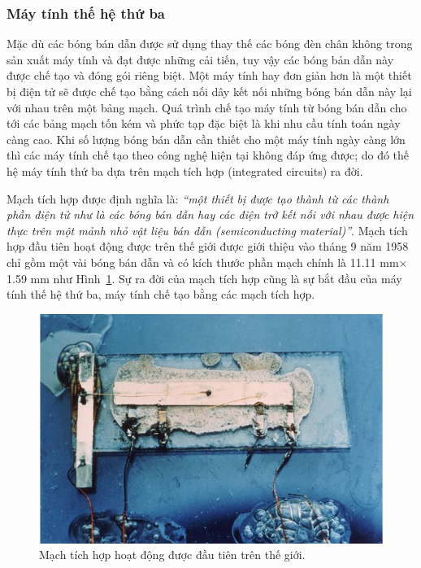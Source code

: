 \subsubsection{Máy tính thế hệ thứ ba}
Mặc dù các bóng bán dẫn được sử dụng thay thế các bóng đèn chân không trong sản xuất máy tính và đạt được những cải tiến, tuy vậy các bóng bản dẫn này được chế tạo và đóng gói riêng biệt. Một máy tính hay đơn giản hơn là một thiết bị điện tử sẽ được chế tạo bằng cách nối dây kết nối những bóng bán dẫn này lại với nhau trên một bảng mạch. Quá trình chế tạo máy tính từ bóng bán dẫn cho tới các bảng mạch tốn kém và phức tạp đặc biệt là khi nhu cầu tính toán ngày càng cao. Khi số lượng bóng bán dẫn cần thiết cho một máy tính ngày càng lớn thì các máy tính chế tạo theo công nghệ hiện tại không đáp ứng được; do đó thế hệ máy tính thứ ba dựa trên mạch tích hợp (integrated circuits) ra đời.

Mạch tích hợp được định nghĩa là: \emph{``một thiết bị được tạo thành từ các thành phần điện tử như là các bóng bán dẫn hay các điện trở kết nối với nhau được hiện thực trên một mảnh nhỏ vật liệu bán dẫn (semiconducting material)''}. Mạch tích hợp đầu tiên hoạt động được trên thế giới được giới thiệu vào tháng 9 năm 1958 chỉ gồm một vài bóng bán dẫn và có kích thước phần mạch chính là 11.11 mm$\times$1.59 mm như Hình~\ref{fig:IC}. Sự ra đời của mạch tích hợp cũng là sự bắt đầu của máy tính thế hệ thứ ba, máy tính chế tạo bằng các mạch tích hợp.

\begin{figure}[h]
	\centering
		\includegraphics[width=0.7\columnwidth]{chapter01/figure/IC.jpg}
		\centering
	\caption{Mạch tích hợp hoạt động được đầu tiên trên thế giới.}
	\label{fig:IC}
\end{figure}

